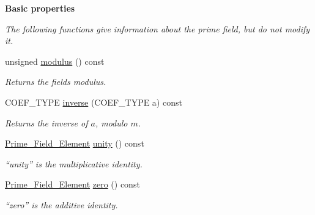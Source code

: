 \begin{Indent}\textbf{ Basic properties}\par
{\em The following functions give information about the prime field, but do not modify it. }\begin{DoxyCompactItemize}
\item 
\mbox{\label{group___fields_group_a342ee34fa19d33919f772669a637f31e}} 
unsigned \hyperlink{group___fields_group_a342ee34fa19d33919f772669a637f31e}{modulus} () const
\begin{DoxyCompactList}\small\item\em Returns the field\textquotesingle{}s modulus. \end{DoxyCompactList}\item 
C\+O\+E\+F\+\_\+\+T\+Y\+PE \hyperlink{group___fields_group_a106e74e004b18c899cd9b9e90ce01f6e}{inverse} (C\+O\+E\+F\+\_\+\+T\+Y\+PE a) const
\begin{DoxyCompactList}\small\item\em Returns the inverse of $a$, modulo $m$. \end{DoxyCompactList}\item 
\mbox{\label{group___fields_group_a97534ab1050f0b34023300f1bd3a97f5}} 
\hyperlink{group___fields_group_class_prime___field___element}{Prime\+\_\+\+Field\+\_\+\+Element} \hyperlink{group___fields_group_a97534ab1050f0b34023300f1bd3a97f5}{unity} () const
\begin{DoxyCompactList}\small\item\em ``unity'' is the multiplicative identity. \end{DoxyCompactList}\item 
\mbox{\label{group___fields_group_ad8eaaf37b9239428a9c9aedc8ab35a12}} 
\hyperlink{group___fields_group_class_prime___field___element}{Prime\+\_\+\+Field\+\_\+\+Element} \hyperlink{group___fields_group_ad8eaaf37b9239428a9c9aedc8ab35a12}{zero} () const
\begin{DoxyCompactList}\small\item\em ``zero'' is the additive identity. \end{DoxyCompactList}\end{DoxyCompactItemize}
\end{Indent}
